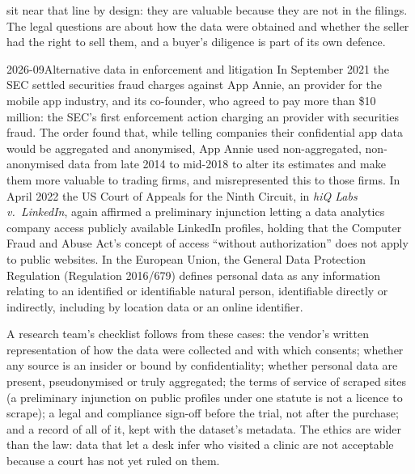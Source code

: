  sit near that line by design: they are valuable because they are not in the filings. The legal questions are about how the
data were obtained and whether the seller had the right to sell them, and a buyer's diligence is part of its own defence.

\begin{dated}{2026-09}{Alternative data in enforcement and litigation}\label{dat:rs:alternative-and-text-data:law}
In September 2021 the SEC settled securities fraud charges against App Annie, an  provider for the mobile app industry, and
its co-founder, who agreed to pay more than \$10 million: the SEC's first enforcement action charging an  provider with
securities fraud. The order found that, while telling companies their confidential app data would be aggregated and anonymised, App Annie used
non-aggregated, non-anonymised data from late 2014 to mid-2018 to alter its estimates and make them more valuable to trading firms, and
misrepresented this to those firms. In April 2022 the US Court of Appeals for the Ninth Circuit, in \emph{hiQ Labs v.\ LinkedIn}, again
affirmed a preliminary injunction letting a data analytics company access publicly available LinkedIn profiles, holding that the Computer
Fraud and Abuse Act's concept of access ``without authorization'' does not apply to public websites. In the European Union, the General Data
Protection Regulation (Regulation 2016/679) defines personal data as any information relating to an identified or identifiable natural
person, identifiable directly or indirectly, including by location data or an online identifier.
\end{dated}

A research team's checklist follows from these cases: the vendor's written representation of how the data were collected and with which
consents; whether any source is an insider or bound by confidentiality; whether personal data are present, pseudonymised or truly aggregated;
the terms of service of scraped sites (a preliminary injunction on public profiles under one statute is not a licence to scrape); a legal and
compliance sign-off before the trial, not after the purchase; and a record of all of it, kept with the dataset's metadata. The ethics are wider
than the law: data that let a desk infer who visited a clinic are not acceptable because a court has not yet ruled on them.

